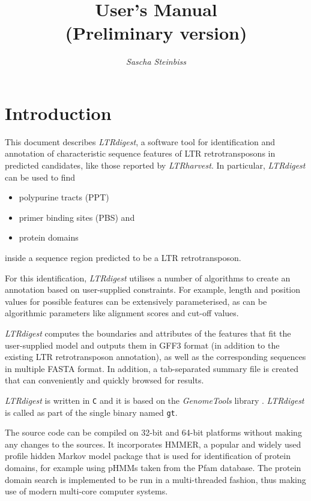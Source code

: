 \documentclass[12pt,titlepage]{article}
\title{\LTRdigest User's Manual\\\footnotesize
(Preliminary version)}
\author{\textit{Sascha Steinbiss}}
\newcommand{\LTRdigest}{\textit{LTRdigest}\xspace}
\newcommand{\GenomeTools}{\textit{GenomeTools}\xspace}
\newcommand{\Gt}{\texttt{gt}\xspace}
\begin{document}
\maketitle

\section{Introduction}
\label{Introduction}

This document describes \LTRdigest , a software tool for identification and annotation of characteristic sequence features of LTR retrotransposons in predicted candidates, like those reported by \emph{LTRharvest}\cite{EKW07}. In particular, \LTRdigest can be used to find
\begin{itemize}
  \item polypurine tracts (PPT)
  \item primer binding sites (PBS) and
  \item protein domains
\end{itemize}
inside a sequence region predicted to be a LTR retrotransposon.

For this identification, \LTRdigest utilises a number of algorithms to create an annotation based on user-supplied constraints. For example, length and position values for possible features can be extensively parameterised, as can be algorithmic parameters like alignment scores and cut-off values.

\LTRdigest computes the boundaries and attributes of the features that fit the user-supplied model and outputs them in GFF3 format\cite{gff3} (in addition to the existing LTR retrotransposon annotation), as well as the corresponding sequences in multiple FASTA format. In addition, a tab-separated summary file is created that can conveniently and quickly browsed for results.

\LTRdigest is written in \texttt{C} and it is based on the \GenomeTools library \cite{genometools}.  \LTRdigest is called as part of the single binary named \Gt.

The source code can be compiled on 32-bit and 64-bit platforms without making any changes to the sources. It incorporates HMMER\cite{hmmer}, a popular and widely used profile hidden Markov model package that is used for identification of protein domains, for example using pHMMs taken from the Pfam\cite{pfam} database. The protein domain search is implemented to be run in a multi-threaded fashion, thus making use of modern multi-core computer systems.
\end{document}
